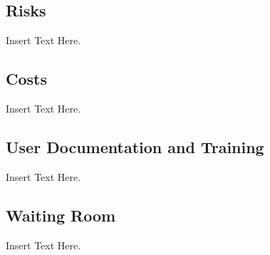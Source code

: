 \documentclass [12pt]{article}
\begin{document}
\subsection{Risks}
	Insert Text Here.
	
\subsection{Costs}	
	Insert Text Here.

\subsection{User Documentation and Training}
	Insert Text Here.

\subsection{Waiting Room}
	Insert Text Here. 
\end{document}
